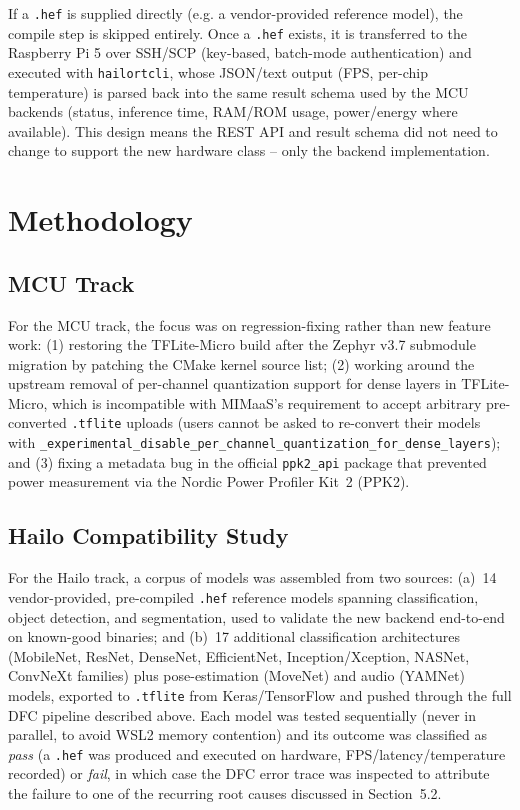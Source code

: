 \documentclass[11pt]{article}
\begin{document}
If a \texttt{.hef} is supplied directly (e.g. a vendor-provided reference
model), the compile step is skipped entirely. Once a \texttt{.hef} exists, it
is transferred to the Raspberry Pi 5 over SSH/SCP (key-based, batch-mode
authentication) and executed with \texttt{hailortcli}, whose JSON/text output
(FPS, per-chip temperature) is parsed back into the same result schema used by
the MCU backends (status, inference time, RAM/ROM usage, power/energy where
available). This design means the REST API and result schema did not need to
change to support the new hardware class -- only the backend implementation.

\section{Methodology}

\subsection{MCU Track}

For the MCU track, the focus was on regression-fixing rather than new
feature work: (1) restoring the TFLite-Micro build after the Zephyr v3.7
submodule migration by patching the CMake kernel source list; (2) working
around the upstream removal of per-channel quantization support for dense
layers in TFLite-Micro, which is incompatible with MIMaaS's requirement to
accept arbitrary pre-converted \texttt{.tflite} uploads (users cannot be asked
to re-convert their models with
\texttt{\_experimental\_disable\_per\_channel\_quantization\_for\_dense\_layers});
and (3) fixing a metadata bug in the official \texttt{ppk2\_api} package that
prevented power measurement via the Nordic Power Profiler Kit~2 (PPK2).

\subsection{Hailo Compatibility Study}

For the Hailo track, a corpus of models was assembled from two sources:
(a)~14 vendor-provided, pre-compiled \texttt{.hef} reference models spanning
classification, object detection, and segmentation, used to validate the new
backend end-to-end on known-good binaries; and (b)~17 additional
classification architectures (MobileNet, ResNet, DenseNet, EfficientNet,
Inception/Xception, NASNet, ConvNeXt families) plus pose-estimation
(MoveNet) and audio (YAMNet) models, exported to \texttt{.tflite} from
Keras/TensorFlow and pushed through the full DFC pipeline described above.
Each model was tested sequentially (never in parallel, to avoid WSL2 memory
contention) and its outcome was classified as \emph{pass} (a \texttt{.hef} was
produced and executed on hardware, FPS/latency/temperature recorded) or
\emph{fail}, in which case the DFC error trace was inspected to attribute the
failure to one of the recurring root causes discussed in Section~5.2.
\end{document}
